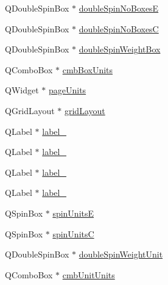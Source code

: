 \begin{DoxyCompactItemize}
\item 
QDoubleSpinBox $\ast$ \hyperlink{class_ui___catch_input_ctrl_aa9fa8f4049a06445c3abbc8291ffe0b3}{doubleSpinNoBoxesE}
\item 
QDoubleSpinBox $\ast$ \hyperlink{class_ui___catch_input_ctrl_a08cd9de7440362184d996c4a693f1738}{doubleSpinNoBoxesC}
\item 
QDoubleSpinBox $\ast$ \hyperlink{class_ui___catch_input_ctrl_aca5b5c50124d550c442508bf5c871b37}{doubleSpinWeightBox}
\item 
QComboBox $\ast$ \hyperlink{class_ui___catch_input_ctrl_ae8f1e20253a8b76bd62f6149b758c13e}{cmbBoxUnits}
\item 
QWidget $\ast$ \hyperlink{class_ui___catch_input_ctrl_ad4d3f4960d555a6730cb0351d284d7e3}{pageUnits}
\item 
QGridLayout $\ast$ \hyperlink{class_ui___catch_input_ctrl_abce8903ef568863906ac33edc67a8f25}{gridLayout}
\item 
QLabel $\ast$ \hyperlink{class_ui___catch_input_ctrl_a916da0c8449e61b9f1c073ff0c2e155c}{label\_}
\item 
QLabel $\ast$ \hyperlink{class_ui___catch_input_ctrl_aa16e8593fe0e150db98bd00e8960554f}{label\_}
\item 
QLabel $\ast$ \hyperlink{class_ui___catch_input_ctrl_afeb1c5fca99de7c2ce25627d5bd712a1}{label\_}
\item 
QLabel $\ast$ \hyperlink{class_ui___catch_input_ctrl_a27c801d7bf9931f63ac93ead50253d45}{label\_}
\item 
QSpinBox $\ast$ \hyperlink{class_ui___catch_input_ctrl_af103c39dda2853d367ade43e1819b817}{spinUnitsE}
\item 
QSpinBox $\ast$ \hyperlink{class_ui___catch_input_ctrl_a6c04044f260cf28a4b66e0e9eeda55da}{spinUnitsC}
\item 
QDoubleSpinBox $\ast$ \hyperlink{class_ui___catch_input_ctrl_a3a85d92aac141bde03e7842eb58e3973}{doubleSpinWeightUnit}
\item 
QComboBox $\ast$ \hyperlink{class_ui___catch_input_ctrl_a02f01f7a03385a0502fbd2d6d557e9a4}{cmbUnitUnits}
\end{DoxyCompactItemize}


